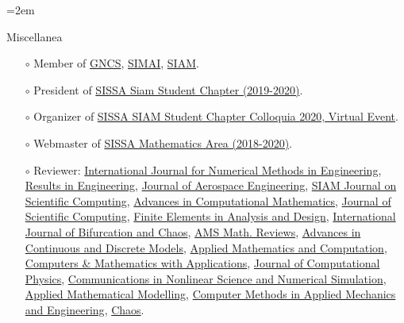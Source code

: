 \documentclass{scrartcl}
\newcommand{\Description}[1]{\hangindent=2em\hangafter=0\noindent\raggedright\footnotesize{#1}\par\normalsize\vspace{1em}} %
\begin{document}
\begin{cv}{}
\vspace{-0.5em}
\Description{{\color{cyan} Miscellanea}
\begin{itemize}
    \item[$\circ$] Member of \href{https://www.altamatematica.it/gncs/}{GNCS}, \href{https://www.simai.eu}{SIMAI}, \href{https://www.siam.org}{SIAM}.
    \item[$\circ$] President of \href{http://www.math.sissa.it/content/sissa-siam-student-chapter}{SISSA Siam Student Chapter (2019-2020)}.
    \item[$\circ$] Organizer of \href{https://www.math.sissa.it/seminar/siam-chapter-colloquia-2020}{SISSA SIAM Student Chapter Colloquia 2020, Virtual Event}.
    \item[$\circ$] Webmaster of \href{https://www.math.sissa.it/content/mathematical-analysis-modelling-and-applications-0}{SISSA Mathematics Area (2018-2020)}.
    \item[$\circ$] Reviewer: \href{https://onlinelibrary.wiley.com/journal/10970207}{ International Journal for Numerical Methods in Engineering}, \href{https://www.sciencedirect.com/journal/results-in-engineering}{Results in Engineering}, \href{https://ascelibrary.org/journal/jaeeez}{Journal of Aerospace Engineering}, \href{https://sisc.siam.org}{SIAM Journal on Scientific Computing}, \href{https://www.springer.com/journal/10444}{Advances in Computational Mathematics}, \href{https://www.springer.com/journal/10915}{Journal of Scientific Computing}, \href{https://www.sciencedirect.com/journal/finite-elements-in-analysis-and-design}{Finite Elements in Analysis and Design}, \href{https://www.worldscientific.com/worldscinet/ijbc}{International Journal of Bifurcation and Chaos}, \href{http://www.ams.org/publications/math-reviews/math-reviews}{AMS Math. Reviews}, \href{https://advancesindifferenceequations.springeropen.com}{Advances in Continuous and Discrete Models}, \href{https://www.sciencedirect.com/journal/applied-mathematics-and-computation}{Applied Mathematics and Computation}, \href{https://www.sciencedirect.com/journal/computers-and-mathematics-with-applications}{Computers \& Mathematics with Applications}, \href{https://www.sciencedirect.com/journal/journal-of-computational-physics}{Journal of Computational Physics}, \href{https://www.sciencedirect.com/journal/communications-in-nonlinear-science-and-numerical-simulation}{Communications in Nonlinear Science and Numerical Simulation}, \href{https://www.sciencedirect.com/journal/applied-mathematical-modelling}{Applied Mathematical Modelling}, \href{https://www.sciencedirect.com/journal/computer-methods-in-applied-mechanics-and-engineering}{Computer Methods in Applied Mechanics and Engineering}, \href{https://pubs.aip.org/aip/cha}{Chaos}.
\end{itemize}}


\end{cv}
\end{document}
